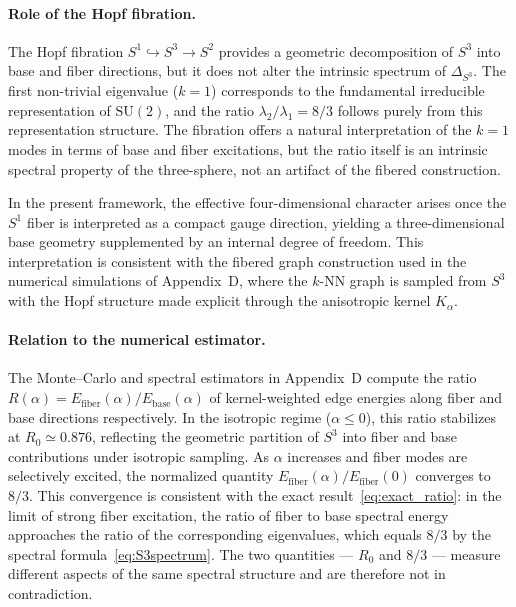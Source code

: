   \paragraph{Role of the Hopf fibration.}
    The Hopf fibration $S^1 \hookrightarrow S^3 \to S^2$ provides a geometric decomposition
    of $S^3$ into base and fiber directions, but it does not alter the intrinsic spectrum of
    $\Delta_{S^3}$.
    The first non-trivial eigenvalue ($k=1$) corresponds to the fundamental irreducible
    representation of $\mathrm{SU}(2)$, and the ratio $\lambda_2/\lambda_1 = 8/3$ follows
    purely from this representation structure.
    The fibration offers a natural interpretation of the $k=1$ modes in terms of base and
    fiber excitations, but the ratio itself is an intrinsic spectral property of the
    three-sphere, not an artifact of the fibered construction.

    In the present framework, the effective four-dimensional character arises once the $S^1$
    fiber is interpreted as a compact gauge direction, yielding a three-dimensional base
    geometry supplemented by an internal degree of freedom.
    This interpretation is consistent with the fibered graph construction used in the
    numerical simulations of Appendix~D, where the $k$-NN graph is sampled from $S^3$ with
    the Hopf structure made explicit through the anisotropic kernel $K_\alpha$.

  \paragraph{Relation to the numerical estimator.}
    The Monte--Carlo and spectral estimators in Appendix~D compute the ratio
    $R(\alpha) = E_\mathrm{fiber}(\alpha)/E_\mathrm{base}(\alpha)$ of kernel-weighted edge
    energies along fiber and base directions respectively.
    In the isotropic regime ($\alpha \leq 0$), this ratio stabilizes at $R_0 \simeq 0.876$,
    reflecting the geometric partition of $S^3$ into fiber and base contributions under
    isotropic sampling.
    As $\alpha$ increases and fiber modes are selectively excited, the normalized quantity
    $E_\mathrm{fiber}(\alpha)/E_\mathrm{fiber}(0)$ converges to $8/3$.
    This convergence is consistent with the exact result~\eqref{eq:exact_ratio}: in the
    limit of strong fiber excitation, the ratio of fiber to base spectral energy approaches
    the ratio of the corresponding eigenvalues, which equals $8/3$ by the spectral
    formula~\eqref{eq:S3spectrum}.
    The two quantities --- $R_0$ and $8/3$ --- measure different aspects of the same
    spectral structure and are therefore not in contradiction.

